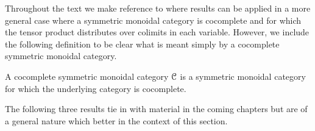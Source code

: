 Throughout the text we make reference to where results can be applied in a more general case where a symmetric monoidal category is cocomplete and for which the tensor product distributes over colimits in each variable. However, we include the following definition to be clear what is meant simply by a cocomplete symmetric monoidal category.
\begin{Defi}\label{cocom_symm_mon_cat}
A cocomplete symmetric monoidal category $\mathcal{C}$ is a symmetric monoidal category for which the underlying category is cocomplete.
\end{Defi}
The following three results tie in with material in the coming chapters but are of a general nature which better in the context of this section.


